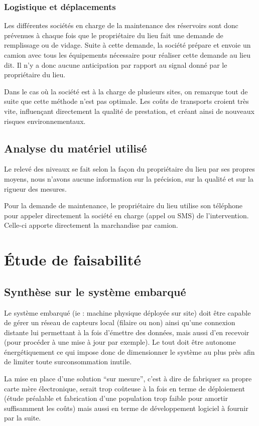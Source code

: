 \documentclass{mise_en_page}
\begin{document}
\subsubsection{Logistique et déplacements}
Les différentes sociétés en charge de la maintenance des réservoirs sont
donc prévenues à chaque fois que le propriétaire du lieu fait une
demande de remplissage ou de vidage. Suite à cette demande, la société
prépare et envoie un camion avec tous les équipements nécessaire pour
réaliser cette demande au lieu dit.  Il n’y a donc aucune anticipation
par rapport au signal donné par le propriétaire du lieu.

Dans le cas où la société est à la charge de plusieurs sites, on
remarque tout de suite que cette méthode n’est pas optimale. Les coûts
de transports croient très vite, influençant directement la qualité de
prestation, et créant ainsi de nouveaux risques environnementaux.

\subsection{Analyse du matériel utilisé}
Le relevé des niveaux se fait selon la façon du propriétaire du lieu
par ses propres moyens, nous n’avons aucune information sur la
précision, sur la qualité et sur la rigueur des mesures.

Pour la demande de maintenance, le propriétaire du lieu utilise son
téléphone pour appeler directement la société en charge (appel ou SMS)
de l’intervention. Celle-ci apporte directement la marchandise par
camion.

\section{Étude de faisabilité}
\subsection{Synthèse sur le système embarqué}
Le système embarqué (ie : machine physique déployée sur site) doit être
capable de gérer un réseau de capteurs local (filaire ou non) ainsi
qu’une connexion distante lui permettant à la fois d’émettre des
données, mais aussi d’en recevoir (pour procéder à une mise à jour par
exemple). Le tout doit être autonome énergétiquement ce qui impose donc
de dimensionner le système au plus près afin de limiter toute
surconsommation inutile.

La mise en place d’une solution “sur mesure”, c’est à dire de fabriquer
sa propre carte mère électronique, serait trop coûteuse à la fois en
terme de déploiement (étude préalable et fabrication d’une population
trop faible pour amortir suffisamment les coûts) mais aussi en terme de
développement logiciel à fournir par la suite.
\end{document}
